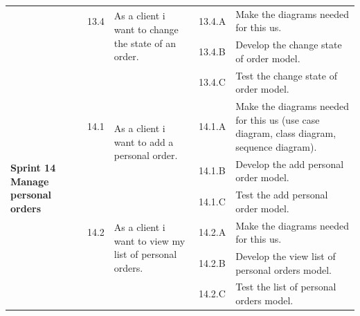 \documentclass[12pt,a4paper]{report}
\begin{document}
\begin{table}[H]
\begin{center}
\begin{tabular}{|  p{3cm}|  p{1cm}| p{4cm}|  p{1cm}| p{6cm}|}
			&                       
			13.4  &  
			\multirow{2}{4cm}{As a client i want to change the state of an order.}
			
			&				                      
			13.4.A &                        
			Make the diagrams needed for this \ac{us}.
			\\ 
			\cline{4-5}    
			&                   
			&                                 
			&                        
			13.4.B &                        
			Develop the change state of order model.
			\\ 
			\cline{4-5}    
			&                   
			&                                 
			&                        
			13.4.C &                        
			Test the change state of order model.
			\\
			\hline
			\multirow{5}{3cm}{\textbf{Sprint 14} \textbf{Manage personal orders} }
			&                       
			14.1  &  
			\multirow{2}{4cm}{As a client i want to add a personal order.}
			
			&				                      
			14.1.A &                        
			Make the diagrams needed for this \ac{us} (use case diagram, class diagram, sequence diagram).
			\\ 
			\cline{4-5}    
			&                   
			&                                 
			&                        
			14.1.B &                        
			Develop the add personal order model.
			\\ 
			\cline{4-5}    
			&                   
			&                                 
			&                        
			14.1.C &                        
			Test the  add personal order model.
			\\
			\cline{2-5}  
			
			&                       
			14.2  &  
			\multirow{2}{4cm}{As a client i want to view my list of personal orders.}
			
			&				                      
			14.2.A &                        
			Make the diagrams needed for this \ac{us}.
			\\ 
			\cline{4-5}    
			&                   
			&                                 
			&                        
			14.2.B &                        
			Develop the view list of personal orders model.
			\\ 
			\cline{4-5}    
			&                   
			&                                 
			&                        
			14.2.C &                        
			Test the list of personal orders model.
			
			\\
			\hline
		\end{tabular}
		
	\end{center}
	
\end{table}
\end{document}
